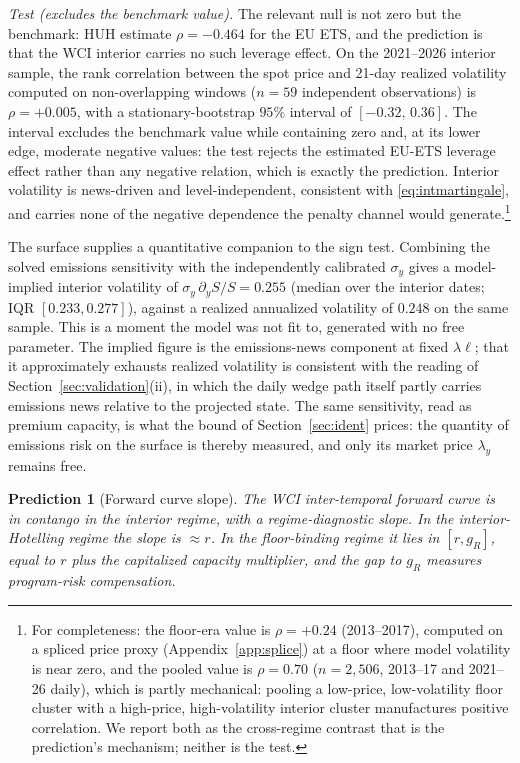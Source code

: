 \documentclass[11pt,letterpaper]{article}
\theoremstyle{plain}
\newtheorem{prediction}{Prediction}[section]
\theoremstyle{definition}
\numberwithin{equation}{section}
\begin{document}
\emph{Test (excludes the benchmark value).} The relevant null is not zero but the benchmark: HUH estimate $\rho=-0.464$ for the EU ETS, and the prediction is that the WCI interior carries no such leverage effect. On the 2021--2026 interior sample, the rank correlation between the spot price and 21-day realized volatility computed on non-overlapping windows ($n=59$ independent observations) is $\rho=+0.005$, with a stationary-bootstrap $95\%$ interval of $[-0.32,\,0.36]$. The interval excludes the benchmark value while containing zero and, at its lower edge, moderate negative values: the test rejects the estimated EU-ETS leverage effect rather than any negative relation, which is exactly the prediction. Interior volatility is news-driven and level-independent, consistent with \eqref{eq:intmartingale}, and carries none of the negative dependence the penalty channel would generate.\footnote{For completeness: the floor-era value is $\rho=+0.24$ (2013--2017), computed on a spliced price proxy (Appendix~\ref{app:splice}) at a floor where model volatility is near zero, and the pooled value is $\rho=0.70$ ($n=2{,}506$, 2013--17 and 2021--26 daily), which is partly mechanical: pooling a low-price, low-volatility floor cluster with a high-price, high-volatility interior cluster manufactures positive correlation. We report both as the cross-regime contrast that is the prediction's mechanism; neither is the test.}

The surface supplies a quantitative companion to the sign test. Combining the solved emissions sensitivity with the independently calibrated $\sigma_y$ gives a model-implied interior volatility of $\sigma_y\,\partial_yS/S=0.255$ (median over the interior dates; IQR $[0.233,0.277]$), against a realized annualized volatility of $0.248$ on the same sample. This is a moment the model was not fit to, generated with no free parameter. The implied figure is the emissions-news component at fixed $\lambda\ell$; that it approximately exhausts realized volatility is consistent with the reading of Section~\ref{sec:validation}(ii), in which the daily wedge path itself partly carries emissions news relative to the projected state. The same sensitivity, read as premium capacity, is what the bound of Section~\ref{sec:ident} prices: the quantity of emissions risk on the surface is thereby measured, and only its market price $\lambda_y$ remains free.
 
\begin{prediction}[Forward curve slope]\label{pred:curve}
The WCI inter-temporal forward curve is in contango in the interior regime, with a regime-diagnostic slope. In the interior-Hotelling regime the slope is $\approx r$. In the floor-binding regime it lies in $[r,g_R]$, equal to $r$ plus the capitalized capacity multiplier, and the gap to $g_R$ measures program-risk compensation.%
\end{prediction}
 
\end{document}
